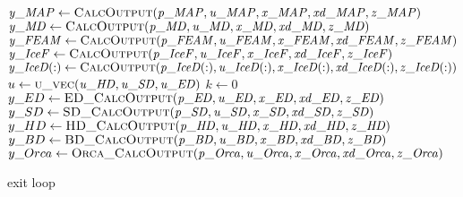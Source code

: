 \documentclass[10pt,letterpaper,oneside,notitlepage]{article}
\begin{document}
\begin{algorithmic}[1]

   \State
   \State $\mathit{y\_MAP}     \gets \Call{CalcOutput}{\mathit{p\_MAP},\mathit{u\_MAP},\mathit{x\_MAP},\mathit{xd\_MAP},\mathit{z\_MAP}}$ 
   \State $\mathit{y\_MD}      \gets \Call{CalcOutput}{\mathit{p\_MD},\mathit{u\_MD},\mathit{x\_MD},\mathit{xd\_MD},\mathit{z\_MD}}$
   \State $\mathit{y\_FEAM}    \gets \Call{CalcOutput}{\mathit{p\_FEAM},\mathit{u\_FEAM},\mathit{x\_FEAM},\mathit{xd\_FEAM},\mathit{z\_FEAM}}$
   \State $\mathit{y\_IceF}    \gets \Call{CalcOutput}{\mathit{p\_IceF},\mathit{u\_IceF},\mathit{x\_IceF},\mathit{xd\_IceF},\mathit{z\_IceF}}$
   \State $\mathit{y\_IceD(:)} \gets \Call{CalcOutput}{\mathit{p\_IceD(:)},\mathit{u\_IceD(:)},\mathit{x\_IceD(:)},\mathit{xd\_IceD(:)},\mathit{z\_IceD(:)}}$
   \State
   \State{}
   \State
   \State $u \gets \Call{u\_vec}{\mathit{u\_HD},\mathit{u\_SD},\mathit{u\_ED}}$
   \State $k \gets 0$
   \Loop{}
      \State $y\_ED   \gets \Call{ED\_CalcOutput}{\mathit{p\_ED},\mathit{u\_ED},\mathit{x\_ED},\mathit{xd\_ED},\mathit{z\_ED}}$
      \State $y\_SD   \gets \Call{SD\_CalcOutput}{\mathit{p\_SD},\mathit{u\_SD},\mathit{x\_SD},\mathit{xd\_SD},\mathit{z\_SD}}$
      \State $y\_HD   \gets \Call{HD\_CalcOutput}{\mathit{p\_HD},\mathit{u\_HD},\mathit{x\_HD},\mathit{xd\_HD},\mathit{z\_HD}}$
      \State $y\_BD   \gets \Call{BD\_CalcOutput}{\mathit{p\_BD},\mathit{u\_BD},\mathit{x\_BD},\mathit{xd\_BD},\mathit{z\_BD}}$
      \State $y\_Orca \gets \Call{Orca\_CalcOutput}{\mathit{p\_Orca},\mathit{u\_Orca},\mathit{x\_Orca},\mathit{xd\_Orca},\mathit{z\_Orca}}$
   
         \State exit loop
      \EndIf
      

\end{algorithmic}
\end{document}
